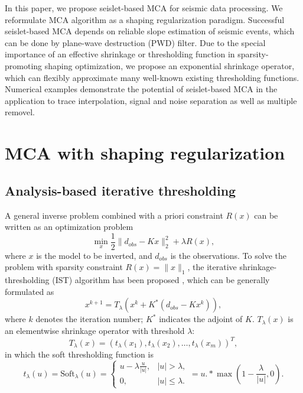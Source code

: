 In this paper, we propose seislet-based MCA for seismic data processing. We reformulate MCA algorithm as a shaping regularization paradigm. Successful seislet-based MCA depends on reliable slope estimation of seismic events, which can be done by plane-wave destruction (PWD) filter. Due to the special importance of an effective shrinkage or thresholding function in sparsity-promoting shaping optimization, we propose an exponential shrinkage operator, which can flexibly  approximate many well-known existing thresholding functions. Numerical examples demonstrate the potential of seislet-based MCA in the application to trace interpolation, signal and noise separation as well as multiple removel.

\section{MCA with shaping regularization}

\subsection{Analysis-based iterative thresholding}

A general inverse problem combined with a priori constraint $R(x)$ can be written as an optimization problem
\begin{equation}\label{eq:sparsity3}
  \min_x \frac{1}{2}\|d_{obs}-K x\|_2^2+\lambda R(x),
\end{equation}
where $x$ is the model to be inverted, and $d_{obs}$ is the observations. To solve the problem with sparsity constraint $R(x)=\|x\|_1$, the iterative shrinkage-thresholding (IST) algorithm has been proposed  \citep{daubechies2004iterative}, which can be generally formulated as
\begin{equation}\label{eq:IST}
   x^{k+1}=T_{\lambda}(x^{k}+K^*(d_{obs}-Kx^{k})),
 \end{equation}
 where $k$ denotes the iteration number; $K^*$ indicates the adjoint of $K$. $T_{\lambda}(x)$ is an elementwise shrinkage operator with threshold $\lambda$:
 \begin{equation}
    T_{\lambda}(x)=(t_{\lambda}(x_1),t_{\lambda}(x_2),\ldots,t_{\lambda}(x_m))^T,
 \end{equation}
in which  the soft thresholding function \citep{donoho1995noising} is
 \begin{equation}
  t_{\lambda}(u)=\mathrm{Soft}_{\lambda}(u)=\left\{\begin{array}{ll}
                           u-\lambda\frac{u}{|u|}, & |u|> \lambda,\\
                           0, & |u|\leq \lambda.
                         \end{array}  \right.
	=u.*\max(1-\frac{\lambda}{|u|},0).
 \end{equation}

